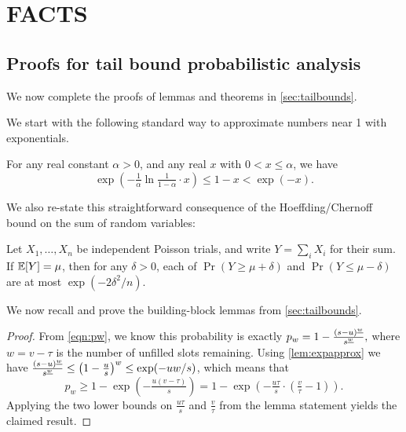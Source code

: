 \section{FACTS}
\subsection{Proofs for tail bound probabilistic analysis}
\label{app:proofs}

We now complete the proofs of lemmas and theorems in \cref{sec:tailbounds}.

We start with the following standard way to approximate numbers near
1 with exponentials.
\begin{lemma}\label{lem:expapprox}
    For any real constant $\alpha>0$, and any
    real $x$ with $0<x\le\alpha$, we have
    \[
    \exp\left(-\tfrac{1}{\alpha}\ln\tfrac{1}{1-\alpha}\cdot{}x\right)
    \le 1-x < \exp(-x).
    \]
\end{lemma}

We also re-state this straightforward consequence of the Hoeffding/Chernoff bound on the sum of random variables:
\begin{lemma}\label{lem:hoeff}
    Let $X_1,\ldots,X_n$ be independent Poisson trials, and write $Y=\sum_i X_i$ for their sum. If $\mathbb{E}[Y] = \mu$, then for any $\delta>0$, each of
    \(\Pr(Y \ge \mu + \delta)\) and  \(\Pr(Y \le \mu - \delta)\)
    are at most \(\exp(-2\delta^2/n)\).
\end{lemma}

We now recall and prove the building-block lemmas from \cref{sec:tailbounds}.

\lemmalowerp*

\begin{proof}
    From \eqref{eqn:pw}, we know this probability is exactly
    $p_w = 1 - \frac{{(s-u)}^{\underline{w}}}{{s}^{\underline{w}}},$
    where $w = v-\tau$ is the number of unfilled slots remaining.
    Using \cref{lem:expapprox} we have
    $\frac{{(s-u)}^{\underline{w}}}{{s}^{\underline{w}}}
    \le \left(1-\frac{u}{s}\right)^w
    \le \exp(-uw/s)$,
    which means that
    \[p_w \ge 1 - \exp\left(-\tfrac{u(v-\tau)}{s}\right)
        = 1 - \exp\left(-\tfrac{u\tau}{s}\cdot{}\left(\tfrac{v}{\tau}-1\right)\right).
    \]
    Applying the two lower bounds on $\frac{u\tau}{s}$ and $\tfrac{v}{\tau}$
    from the lemma statement yields the claimed result.
\end{proof}

\lemmaupperp*

